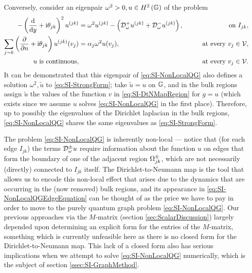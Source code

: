 Conversely, consider an eigenpair $\omega^2>0, u\in H^2\left( \mathbb{G} \right)$ of the problem
\begin{subequations} \label{eq:SI-NonLocalQG}
	\begin{align}
		- \left( \dfrac{\mathrm{d}}{\mathrm{d}y} + \mathrm{i}\theta_{jk} \right)^2u^{(jk)} 
		&= \omega^2 u^{(jk)} - \left(  \mathcal{D}^+_\omega u^{(jk)} + \mathcal{D}^-_\omega u^{(jk)} \right),
		&\qquad\text{on } I_{jk}, \label{eq:SI-NonLocalQGEdgeEquation}  \\
		\sum_{j\sim k} \left( \dfrac{\partial }{\partial n}+\mathrm{i}\theta_{jk} \right) u^{(jk)}(v_j) &= \alpha_j\omega^2 u(v_j),
		&\qquad\text{at every } v_j\in\mathcal{V}, \label{eq:SI-NonLocalQGVertexDeriv} \\
		u \text{ is continuous,} & 
		&\qquad\text{at every } v_j\in\mathcal{V}. \label{eq:SI-NonLocalQGVertexCont}
	\end{align}
\end{subequations}
It can be demonstrated that this eigenpair of \eqref{eq:SI-NonLocalQG} also defines a solution $\omega^2, \tilde{u}$ to \eqref{eq:SI-StrongForm}; take $\tilde{u}=u$ on $\mathbb{G}$, and in the bulk regions assign $\tilde{u}$ the values of the function $v$ in \eqref{eq:SI-DtNMapRegion} for $g=u$ (which exists since we assume $u$ solves \eqref{eq:SI-NonLocalQG} in the first place).
Therefore, up to possibly the eigenvalues of the Dirichlet laplacian in the bulk regions, \eqref{eq:SI-NonLocalQG} shares the same eigenvalues as \eqref{eq:SI-StrongForm}.

The problem \eqref{eq:SI-NonLocalQG} is inherently non-local --- notice that (for each edge $I_{jk}$) the terms $\mathcal{D}^{\pm}_\omega u$ require information about the function $u$ on edges that form the boundary of one of the adjacent region $\Omega_{jk}^{\pm}$, which are not necessarily (directly) connected to $I_{jk}$ itself.
The Dirichlet-to-Neumann map is the tool that allows us to encode this non-local effect that arises due to the dynamics that are occurring in the (now removed) bulk regions, and its appearance in \eqref{eq:SI-NonLocalQGEdgeEquation} can be thought of as the price we have to pay in order to move to the purely quantum graph problem \eqref{eq:SI-NonLocalQG}.
Our previous approaches via the $M$-matrix (section \ref{sec:ScalarDiscussion}) largely depended upon determining an explicit form for the entries of the $M$-matrix, something which is currently unfeasible here as there is no closed form for the Dirichlet-to-Neumann map.
This lack of a closed form also has serious implications when we attempt to solve \eqref{eq:SI-NonLocalQG} numerically, which is the subject of section \ref{ssec:SI-GraphMethod}.

